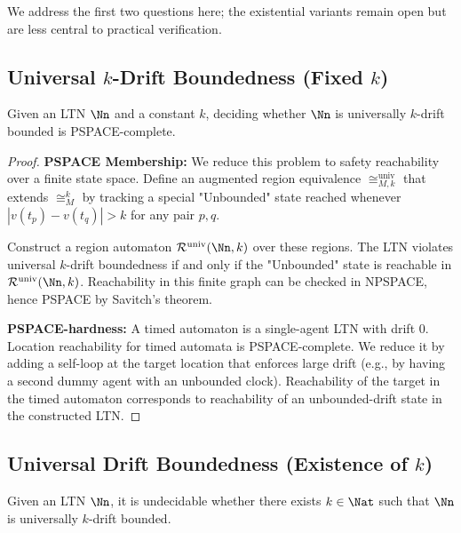 We address the first two questions here; the existential variants remain open but are less central to practical verification.

\subsection{Universal $k$-Drift Boundedness (Fixed $k$)}

\begin{proposition}
\label{prop:universal-k-decidable}
Given an LTN $\Nn$ and a constant $k$, deciding whether $\Nn$ is universally $k$-drift bounded is PSPACE-complete.
\end{proposition}

\begin{proof}
\textbf{PSPACE Membership:} 
We reduce this problem to safety reachability over a finite state space. Define an augmented region equivalence $\cong_{M,k}^{\mathrm{univ}}$ that extends $\cong_M^k$ by tracking a special "Unbounded" state reached whenever $|v(t_p) - v(t_q)| > k$ for any pair $p, q$.

Construct a region automaton $\mathcal{R}^{\mathrm{univ}}(\Nn, k)$ over these regions. The LTN violates universal $k$-drift boundedness if and only if the "Unbounded" state is reachable in $\mathcal{R}^{\mathrm{univ}}(\Nn, k)$. Reachability in this finite graph can be checked in NPSPACE, hence PSPACE by Savitch's theorem.

\textbf{PSPACE-hardness:} 
A timed automaton is a single-agent LTN with drift 0. Location reachability for timed automata is PSPACE-complete. We reduce it by adding a self-loop at the target location that enforces large drift (e.g., by having a second dummy agent with an unbounded clock). Reachability of the target in the timed automaton corresponds to reachability of an unbounded-drift state in the constructed LTN.
\end{proof}

\subsection{Universal Drift Boundedness (Existence of $k$)}

\begin{proposition}
\label{prop:universal-undecidable}
Given an LTN $\Nn$, it is undecidable whether there exists $k \in \Nat$ such that $\Nn$ is universally $k$-drift bounded.
\end{proposition}

